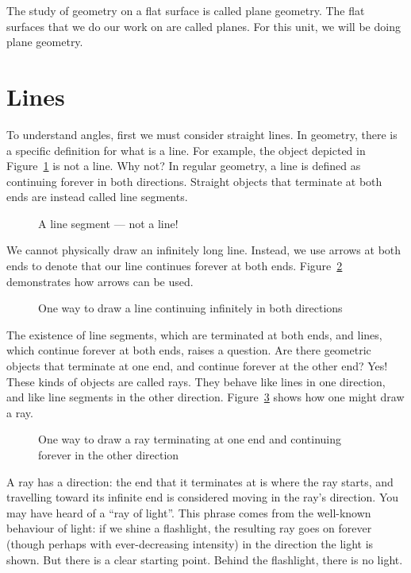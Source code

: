 \documentclass[a4paper,10pt]{report}
\begin{document}
The study of geometry on a flat surface is called \gls{plane geometry}. The flat
surfaces that we do our work on are called \glspl{plane}. For this unit, we will
be doing plane geometry.

\section{Lines}

To understand angles, first we must consider straight lines. In geometry, there
is a specific definition for what is a \gls{line}. For example, the object
depicted in Figure~\ref{an:line-segment} is not a line. Why not? In regular
geometry, a line is defined as continuing forever in both directions. Straight
objects that terminate at both ends are instead called \glspl{line segment}.

\begin{figure}
 \fgLineSegment{}

 \caption{A line segment --- not a line!}
 \label{an:line-segment}
\end{figure}

We cannot physically draw an infinitely long line. Instead, we use arrows at
both ends to denote that our line continues forever at both ends.
Figure~\ref{an:line} demonstrates how arrows can be used.

\begin{figure}
 \fgLine{}

 \caption{One way to draw a line continuing infinitely in both directions}
 \label{an:line}
\end{figure}

The existence of line segments, which are terminated at both ends, and lines,
which continue forever at both ends, raises a question. Are there geometric
objects that terminate at one end, and continue forever at the other end? Yes!
These kinds of objects are called \glspl{ray}. They behave like lines in one
direction, and like line segments in the other direction. Figure~\ref{an:ray}
shows how one might draw a ray.

\begin{figure}
 \fgRay{}

 \caption{One way to draw a ray terminating at one end and continuing forever
 in the other direction}
 \label{an:ray}
\end{figure}

A ray has a direction: the end that it terminates at is where the ray starts,
and travelling toward its infinite end is considered moving in the ray's
direction. You may have heard of a ``ray of light''. This phrase comes from the
well-known behaviour of light: if we shine a flashlight, the resulting ray goes
on forever (though perhaps with ever-decreasing intensity) in the direction the
light is shown. But there is a clear starting point. Behind the flashlight,
there is no light.
\end{document}
